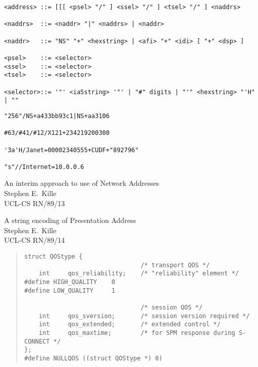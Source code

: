 \begin{bwslide}

\smaller
\begin{verbatim}
<address> ::= [[[ <psel> "/" ] <ssel> "/" ] <tsel> "/" ] <naddrs>

<naddrs>  ::= <naddr> "|" <naddrs> | <naddr>

<naddr>   ::= "NS" "+" <hexstring> | <afi> "+" <idi> [ "+" <dsp> ]

<psel>    ::= <selector>
<ssel>    ::= <selector>
<tsel>    ::= <selector>

<selector>::= '"' <ia5string> '"' | "#" digits | "'" <hexstring> "'H" | ""
\end{verbatim}
\end{bwslide}


\begin{bwslide}

\begin{verbatim}
"256"/NS+a433bb93c1|NS+aa3106

#63/#41/#12/X121+234219200300

'3a'H/Janet=00002340555+CUDF+"892796"

"s"//Internet=10.0.0.6
\end{verbatim}
\end{bwslide}


\begin{bwslide}

\begin{nrtc}
\item	An interim approach to use of Network Addresses\\
	Stephen E.~Kille\\
	UCL-CS RN/89/13

\item	A string encoding of Presentation Address\\
	Stephen E.~Kille\\
	UCL-CS RN/89/14
\end{nrtc}
\end{bwslide}


\begin{bwslide}

\begin{quote}\small\begin{verbatim}
struct QOStype {
                                /* transport QOS */
    int     qos_reliability;    /* "reliability" element */
#define HIGH_QUALITY    0
#define LOW_QUALITY     1

                                /* session QOS */
    int     qos_sversion;       /* session version required */
    int     qos_extended;       /* extended control */
    int     qos_maxtime;        /* for SPM response during S-CONNECT */
};
#define NULLQOS ((struct QOStype *) 0)
\end{verbatim}\end{quote}
\end{bwslide}


